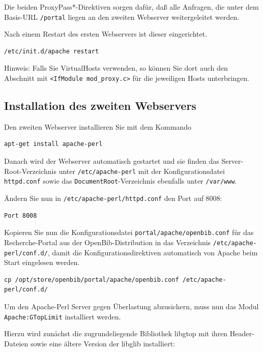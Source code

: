 \documentclass[11pt, twoside, a4paper, BCOR8mm, DIV12, bibtotoc,idxtotoc]{scrbook}
\begin{document}
Die beiden ProxyPass*-Direktiven sorgen dafür, daß alle Anfragen,
die unter dem Basis-URL \texttt{/portal} liegen an den zweiten Webserver
weitergeleitet werden.

Nach einem Restart des ersten Webservers ist dieser eingerichtet.

\begin{verbatim}
/etc/init.d/apache restart
\end{verbatim}


Hinweis: Falls Sie VirtualHosts verwenden, so können Sie dort auch
den Abschnitt mit \texttt{<IfModule mod\_proxy.c>} für die jeweiligen Hosts
unterbringen.


\subsection{Installation des zweiten Webservers}

Den zweiten Webserver installieren Sie mit dem Kommando

\begin{verbatim}
apt-get install apache-perl
\end{verbatim}

Danach wird der Webserver automatisch gestartet und sie finden das
Server-Root-Verzeichnis unter \texttt{/etc/apache-perl} mit der
Konfigurationsdatei \texttt{httpd.conf} sowie das
\texttt{DocumentRoot}-Verzeichnis ebenfalls unter \texttt{/var/www}.

Ändern Sie nun in \texttt{/etc/apache-perl/httpd.conf} den Port auf
8008:

\begin{verbatim}
Port 8008
\end{verbatim}

Kopieren Sie nun die Konfigurationsdatei
\texttt{portal/apache/openbib.conf} für das Recherche-Portal aus der
OpenBib-Distribution in das Verzeichnis
\texttt{/etc/apache-perl/conf.d/}, damit die Konfigurationsdirektiven
automatisch von Apache beim Start eingelesen werden.

\begin{verbatim}
cp /opt/store/openbib/portal/apache/openbib.conf /etc/apache-perl/conf.d/
\end{verbatim}

Um den Apache-Perl Server gegen Überlastung abzusichern, muss nun das
Modul \texttt{Apache:GTopLimit} installiert werden.

Hierzu wird zunächst die zugrundeliegende Bibliothek libgtop mit
ihren Header-Dateien sowie eine ältere Version der libglib
installiert:
\end{document}
